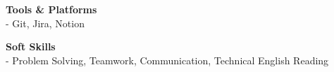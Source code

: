 \documentclass[10pt,a4paper]{article}
\begin{document}
\vspace{8pt}

\begin{minipage}[t]{0.5\textwidth}
    \textbf{\small Tools \& Platforms} \\[1pt]
    - Git, Jira, Notion 
\end{minipage}%
\begin{minipage}[t]{0.5\textwidth}
    \textbf{\small Soft Skills} \\[1pt]
    - Problem Solving, Teamwork, Communication, Technical English Reading
\end{minipage}
\end{document}
